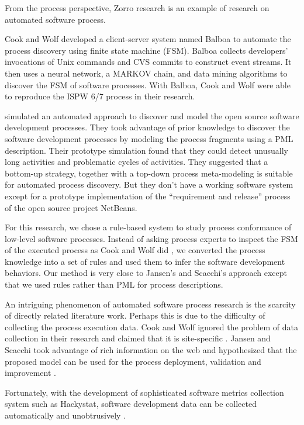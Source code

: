 \documentclass[smallextended]{svjour3}     %
\begin{document}
From the process perspective, Zorro research is an example of research on automated 
software process. 

Cook and Wolf \citep{Cook:95,Cook:96} developed a client-server 
system named Balboa to automate the process discovery using 
finite state machine (FSM). Balboa collects developers' 
invocations of Unix commands and CVS commits to construct
event streams. It then uses a neural network, a MARKOV chain, 
and data mining algorithms to discover 
the FSM of software processes. With Balboa, Cook and Wolf 
were able to reproduce the ISPW 6/7 process in their research. 

\cite{Jensen:04,Jensen:05} simulated an 
automated approach to discover and model the open source 
software development processes. They took advantage of prior 
knowledge to discover the software development processes by 
modeling the process fragments using a PML description. Their 
prototype simulation found that they could detect unusually 
long activities and problematic cycles of activities. They 
suggested that a bottom-up strategy, together with a top-down 
process meta-modeling is suitable for automated process 
discovery. But they don't have a working software system except 
for a prototype implementation of the ``requirement and 
release'' process of the open source project NetBeans.

For this research, we chose a rule-based
system to study process conformance of low-level software 
processes. Instead of asking process experts to inspect the
FSM of the executed process as Cook and Wolf did \citep{Cook:95}, 
we converted the process knowledge into a set of rules and used them 
to infer the software development behaviors. Our method
is very close to Jansen's and Scacchi's approach \citep{Jensen:04} 
except that we used rules rather than PML for process descriptions. 

An intriguing phenomenon of automated software process research
is the scarcity of directly related literature work. Perhaps this 
is due to the difficulty of collecting the process execution data. 
Cook and Wolf ignored the problem of data collection in their 
research and claimed that it is site-specific \citep{Cook:95}. 
Jansen and Scacchi took advantage of rich information on the web 
and hypothesized that the proposed model can be used for the 
process deployment, validation and improvement \citep{Jensen:04}. 

Fortunately, with the development of sophisticated software metrics
collection system such as Hackystat, software development data can be
collected automatically and unobtrusively
\citep{csdl2-01-12,csdl2-01-13,csdl2-02-07}. 
\end{document}
